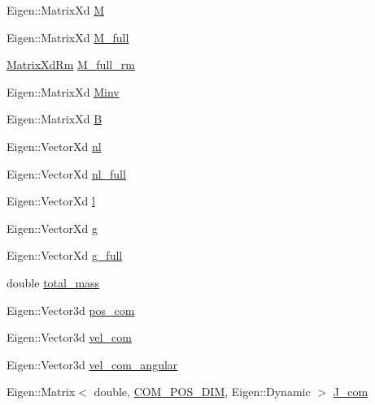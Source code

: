 \begin{DoxyCompactItemize}
\-Eigen\-::\-Matrix\-Xd \hyperlink{structOcraWbiModel_1_1OcraWbiModel__pimpl_a56b6cb4adf9dead06b4d09fe38daa26e}{\-M}
\item 
\-Eigen\-::\-Matrix\-Xd \hyperlink{structOcraWbiModel_1_1OcraWbiModel__pimpl_af57ebe4c5c15477a9592dd91a5c96f12}{\-M\-\_\-full}
\item 
\hyperlink{namespaceocra__icub_aa5e36a19ed031c28ca83c207bd7dd83f}{\-Matrix\-Xd\-Rm} \hyperlink{structOcraWbiModel_1_1OcraWbiModel__pimpl_a6ed8d69d83b0321920c0f79cf8e58bde}{\-M\-\_\-full\-\_\-rm}
\item 
\-Eigen\-::\-Matrix\-Xd \hyperlink{structOcraWbiModel_1_1OcraWbiModel__pimpl_a4d95e99d368b2e61c2945c1eeabff823}{\-Minv}
\item 
\-Eigen\-::\-Matrix\-Xd \hyperlink{structOcraWbiModel_1_1OcraWbiModel__pimpl_a71a78aa74a5b1422df339991ea6c6974}{\-B}
\item 
\-Eigen\-::\-Vector\-Xd \hyperlink{structOcraWbiModel_1_1OcraWbiModel__pimpl_aabdfee290923f49af80f11c524bae456}{nl}
\item 
\-Eigen\-::\-Vector\-Xd \hyperlink{structOcraWbiModel_1_1OcraWbiModel__pimpl_abea2880fe7e4fa2672ce55635ab9ea6c}{nl\-\_\-full}
\item 
\-Eigen\-::\-Vector\-Xd \hyperlink{structOcraWbiModel_1_1OcraWbiModel__pimpl_acc77ea549dd56164264c9436d8188b50}{l}
\item 
\-Eigen\-::\-Vector\-Xd \hyperlink{structOcraWbiModel_1_1OcraWbiModel__pimpl_ac9a96e0afe19e395bfadf4a21b6d0f5b}{g}
\item 
\-Eigen\-::\-Vector\-Xd \hyperlink{structOcraWbiModel_1_1OcraWbiModel__pimpl_a76adc7eb17d82f9234a4f130c2712be5}{g\-\_\-full}
\item 
double \hyperlink{structOcraWbiModel_1_1OcraWbiModel__pimpl_a992e0b522d3e3b9206f90dbcdd4727cf}{total\-\_\-mass}
\item 
\-Eigen\-::\-Vector3d \hyperlink{structOcraWbiModel_1_1OcraWbiModel__pimpl_acc028d57a70c3b36838f28ea518f65c4}{pos\-\_\-com}
\item 
\-Eigen\-::\-Vector3d \hyperlink{structOcraWbiModel_1_1OcraWbiModel__pimpl_a96c3cdb51b2a2b69c0738605c30e1b2e}{vel\-\_\-com}
\item 
\-Eigen\-::\-Vector3d \hyperlink{structOcraWbiModel_1_1OcraWbiModel__pimpl_a696d73e62837978589a2730c8feb325c}{vel\-\_\-com\-\_\-angular}
\item 
\-Eigen\-::\-Matrix$<$ double, \*
\hyperlink{OcraWbiModel_8cpp_a72cb22de2538ae949cc73fa3d7c33bdc}{\-C\-O\-M\-\_\-\-P\-O\-S\-\_\-\-D\-I\-M}, \-Eigen\-::\-Dynamic $>$ \hyperlink{structOcraWbiModel_1_1OcraWbiModel__pimpl_ab724e92a7f74f03c3842f22129b2ad94}{\-J\-\_\-com}

\end{DoxyCompactItemize}
